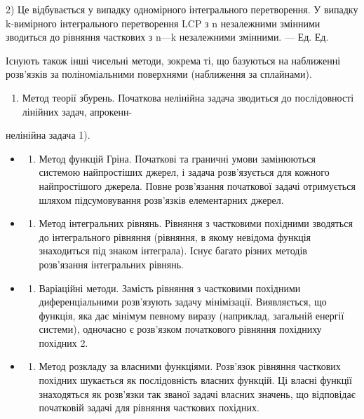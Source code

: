 2) Це відбувається у випадку одномірного інтегрального перетворення. У випадку k-вимірного інтегрального перетворення LCP з n незалежними змінними зводиться до рівняння часткових з n---k незалежними змінними. --- Ед. Ед.

Існують також інші чисельні методи, зокрема ті, що базуються на наближенні розв'язків за поліноміальними поверхнями (наближення за сплайнами).

\begin{enumerate}
\def\labelenumi{\arabic{enumi}.}
\setcounter{enumi}{5}
\tightlist
\item
  Метод теорії збурень. Початкова нелінійна задача зводиться до послідовності лінійних задач, апрокенн-
\end{enumerate}

нелінійна задача 1).

\begin{itemize}
\tightlist
\item
  \begin{enumerate}
  \def\labelenumi{\arabic{enumi}.}
  \setcounter{enumi}{6}
  \tightlist
  \item
    Метод функцій Гріна. Початкові та граничні умови замінюються системою найпростіших джерел, і задача розв'язується для кожного найпростішого джерела. Повне розв'язання початкової задачі отримується шляхом підсумовування розв'язків елементарних джерел.
  \end{enumerate}
\item
  \begin{enumerate}
  \def\labelenumi{\arabic{enumi}.}
  \setcounter{enumi}{7}
  \tightlist
  \item
    Метод інтегральних рівнянь. Рівняння з частковими похідними зводяться до інтегрального рівняння (рівняння, в якому невідома функція знаходиться під знаком інтеграла). Існує багато різних методів розв'язання інтегральних рівнянь.
  \end{enumerate}
\item
  \begin{enumerate}
  \def\labelenumi{\arabic{enumi}.}
  \setcounter{enumi}{8}
  \tightlist
  \item
    Варіаційні методи. Замість рівняння з частковими похідними диференціальними розв'язують задачу мінімізації. Виявляється, що функція, яка дає мінімум певному виразу (наприклад, загальній енергії системи), одночасно є розв'язком початкового рівняння похідниху похідних 2.
  \end{enumerate}
\item
  \begin{enumerate}
  \def\labelenumi{\arabic{enumi}.}
  \setcounter{enumi}{9}
  \tightlist
  \item
    Метод розкладу за власними функціями. Розв'язок рівняння часткових похідних шукається як послідовність власних функцій. Ці власні функції знаходяться як розв'язки так званої задачі власних значень, що відповідає початковій задачі для рівняння часткових похідних.
  \end{enumerate}
\end{itemize}

